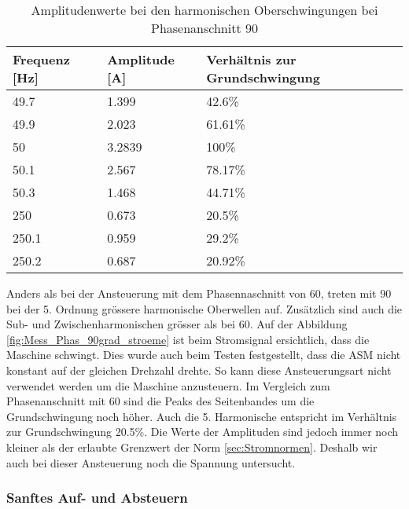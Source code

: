 \begin{table}[ht!]
	\centering
	\begin{tabular}{|l|l|l|}
		\hline
		Frequenz {[}Hz{]} & Amplitude {[}A{]} & Verhältnis zur Grundschwingung	\\ \hline
		49.7              & 1.399             & 42.6\%							\\ \hline
		49.9              & 2.023             & 61.61\%							\\ \hline
		50                & 3.2839            & 100\%							\\ \hline
		50.1              & 2.567             & 78.17\%							\\ \hline
		50.3              & 1.468             & 44.71\%							\\ \hline
		250               & 0.673             & 20.5\%							\\ \hline
		250.1             & 0.959             & 29.2\%							\\ \hline
		250.2             & 0.687             & 20.92\%							\\ \hline
	\end{tabular}
	\caption{Amplitudenwerte bei den harmonischen Oberschwingungen bei Phasenanschnitt 90\textdegree}\label{tab:Phas_90_ASM_stroeme}
\end{table}

Anders als bei der Ansteuerung mit dem Phasennaschnitt von 60\textdegree, treten mit 90\textdegree \hspace{0.02cm} bei der 5. Ordnung grössere harmonische Oberwellen auf. Zusätzlich sind auch die Sub- und Zwischenharmonischen grösser als bei 60\textdegree. Auf der Abbildung \ref{fig:Mess_Phas_90grad_stroeme} ist beim Stromsignal ersichtlich, dass die Maschine schwingt. Dies wurde auch beim Testen festgestellt, dass die ASM nicht konstant auf der gleichen Drehzahl drehte. So kann diese Ansteuerungsart nicht verwendet werden um die Maschine anzusteuern. 
Im Vergleich zum Phasenanschnitt mit 60\textdegree\hspace{0.02cm} sind die Peaks des Seitenbandes um die Grundschwingung noch höher. Auch die 5. Harmonische entspricht im Verhältnis zur Grundschwingung 20.5\%. Die Werte der Amplituden sind jedoch immer noch kleiner als der erlaubte Grenzwert der Norm \ref{sec:Stromnormen}. Deshalb wir auch bei dieser Ansteuerung noch die Spannung untersucht. 



\subsubsection*{Sanftes Auf- und Absteuern}

